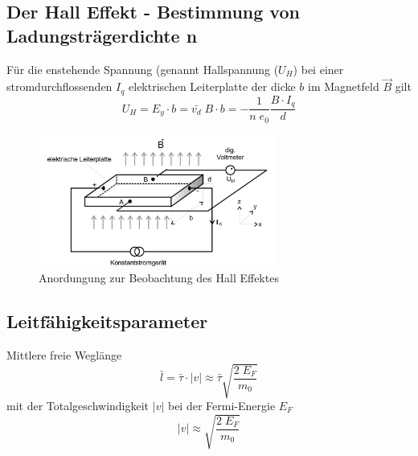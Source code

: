 \subsection{Der Hall Effekt - Bestimmung von Ladungsträgerdichte n}
Für die enstehende Spannung (genannt Hallspannung ($U_H$) bei einer stromdurchflossenden $I_q$
elektrischen Leiterplatte der dicke $b$ im Magnetfeld $\vec{B}$ gilt
\begin{equation}
    U_H=E_y \cdot b = \bar{v_d}\;B\cdot b = -\frac{1}{n \; e_0}\frac{B \cdot I_q}{d}
\end{equation}
\begin{figure}[H]
    \centering
    \includegraphics[width=0.7\textwidth]{bilder/HAll.jpg}
    \caption{Anordungung zur Beobachtung des Hall Effektes \cite[265]{Anleitung}}
    \label{fig:hall}
\end{figure}



\subsection{Leitfähigkeitsparameter}
Mittlere freie Weglänge 
\begin{equation}
    \bar{l}=\bar{\tau} \cdot |v| \approx \bar{\tau}\sqrt{\frac{2\;E_F}{m_0}}  
\end{equation}
mit der Totalgeschwindigkeit $|v|$ bei der Fermi-Energie $E_F$
\begin{equation}
    |v|\approx \sqrt{\frac{2\;E_F}{m_0}}    
\end{equation} 






